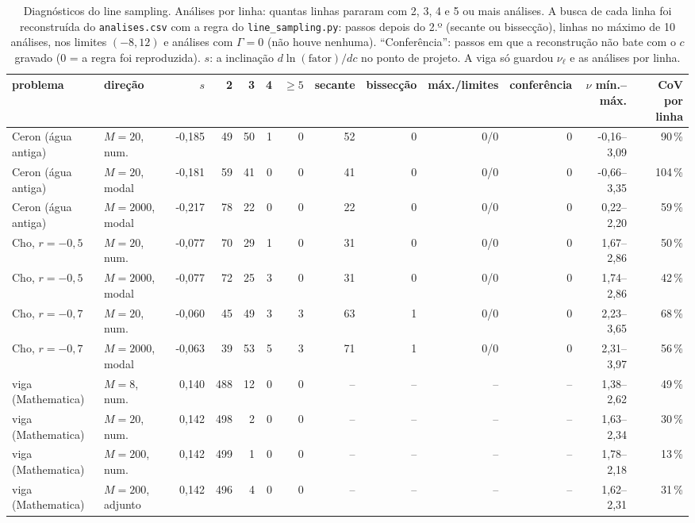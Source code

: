 \begin{landscape}
\begin{table}[H]\centering\footnotesize
\caption{Diagnósticos do line sampling. Análises por linha: quantas linhas pararam com 2, 3, 4 e 5 ou mais análises. A busca de cada linha foi reconstruída do \texttt{analises.csv} com a regra do \texttt{line\_sampling.py}: passos depois do 2.º (secante ou bissecção), linhas no máximo de 10 análises, nos limites $(-8, 12)$ e análises com $\Gamma = 0$ (não houve nenhuma). ``Conferência'': passos em que a reconstrução não bate com o $c$ gravado (0 = a regra foi reproduzida). $s$: a inclinação $d\ln(\text{fator})/dc$ no ponto de projeto. A viga só guardou $\nu_\ell$ e as análises por linha.}\label{tab:lsdiag}
\begin{tabular}{llrrrrrrrrrrr}\toprule
problema & direção & $s$ & 2 & 3 & 4 & $\ge 5$ & secante & bissecção & máx./limites & conferência & $\nu$ mín.--máx. & CoV por linha \\\midrule
Ceron (água antiga) & $M = 20$, num. & -0,185 & 49 & 50 & 1 & 0 & 52 & 0 & 0/0 & 0 & -0,16--3,09 & 90\,\% \\
Ceron (água antiga) & $M = 20$, modal & -0,181 & 59 & 41 & 0 & 0 & 41 & 0 & 0/0 & 0 & -0,66--3,35 & 104\,\% \\
Ceron (água antiga) & $M = 2000$, modal & -0,217 & 78 & 22 & 0 & 0 & 22 & 0 & 0/0 & 0 & 0,22--2,20 & 59\,\% \\
Cho, $r = -0{,}5$ & $M = 20$, num. & -0,077 & 70 & 29 & 1 & 0 & 31 & 0 & 0/0 & 0 & 1,67--2,86 & 50\,\% \\
Cho, $r = -0{,}5$ & $M = 2000$, modal & -0,077 & 72 & 25 & 3 & 0 & 31 & 0 & 0/0 & 0 & 1,74--2,86 & 42\,\% \\
Cho, $r = -0{,}7$ & $M = 20$, num. & -0,060 & 45 & 49 & 3 & 3 & 63 & 1 & 0/0 & 0 & 2,23--3,65 & 68\,\% \\
Cho, $r = -0{,}7$ & $M = 2000$, modal & -0,063 & 39 & 53 & 5 & 3 & 71 & 1 & 0/0 & 0 & 2,31--3,97 & 56\,\% \\
viga (Mathematica) & $M = 8$, num. & 0,140 & 488 & 12 & 0 & 0 & -- & -- & -- & -- & 1,38--2,62 & 49\,\% \\
viga (Mathematica) & $M = 20$, num. & 0,142 & 498 & 2 & 0 & 0 & -- & -- & -- & -- & 1,63--2,34 & 30\,\% \\
viga (Mathematica) & $M = 200$, num. & 0,142 & 499 & 1 & 0 & 0 & -- & -- & -- & -- & 1,78--2,18 & 13\,\% \\
viga (Mathematica) & $M = 200$, adjunto & 0,142 & 496 & 4 & 0 & 0 & -- & -- & -- & -- & 1,62--2,31 & 31\,\% \\
\bottomrule\end{tabular}\end{table}
\end{landscape}
